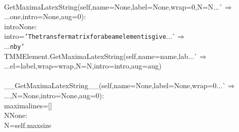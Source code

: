 {{\begin{tabbing}
\\
\hspace{5pt}GetMaximaLatexString(self,name=None,label=None,wrap=0,N=N{}...\`$\Rightarrow$\\
...{}one,intro=None,aug=0):
\\
\hspace{5pt}intro\hspace{5pt}None:
\\
\hspace{60pt}intro={\texttt{{'}The\hspace{5pt}transfer\hspace{5pt}matrix\hspace{5pt}for\hspace{5pt}a\hspace{5pt}beam\hspace{5pt}element\hspace{5pt}is\hspace{5pt}give}}{}...\`$\Rightarrow$\\
...{}{\texttt{n\hspace{5pt}by{'}}}
\\
\hspace{5pt}TMMElement.GetMaximaLatexString(self,name=name,lab{}...\`$\Rightarrow$\\
...{}el=label,wrap=wrap,N=N,intro=intro,aug=aug)
\\
\hspace{40pt}
\\
\hspace{5pt}\_\_GetMaximaLatexString\_\_(self,name=None,label=None,wrap=0{}...\`$\Rightarrow$\\
...{},N=None,intro=None,aug=0):
\\
\hspace{40pt}maximalines={[}{]}
\\
\hspace{5pt}N\hspace{5pt}None:
\\
\hspace{60pt}N=self.maxsize
\\

\end{tabbing}}}
